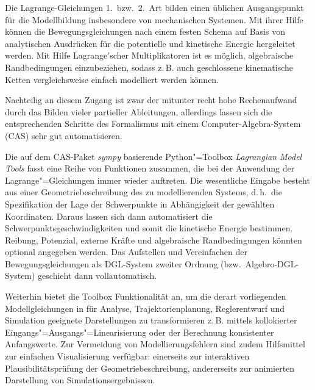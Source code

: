 \documentclass{gma}
\begin{document}
\erstautor{}

\maketitle
Die Lagrange-Gleichungen 1.\ bzw.\ 2.\ Art bilden einen üblichen Ausgangspunkt für die Modellbildung insbesondere von mechanischen Systemen. Mit ihrer Hilfe können die Bewegungsgleichungen nach einem festen Schema auf Basis von analytischen Ausdrücken für die potentielle und kinetische Energie hergeleitet werden. Mit Hilfe Lagrange'scher Multiplikatoren ist es möglich, algebraische Randbedingungen einzubeziehen, sodass z.\,B. auch geschlossene kinematische Ketten vergleichsweise einfach modelliert werden können.

Nachteilig an diesem Zugang ist zwar der mitunter recht hohe Rechenaufwand durch das Bilden vieler partieller Ableitungen, allerdings lassen sich die entsprechenden Schritte des Formalismus mit einem Computer-Algebra-System (CAS) sehr gut automatisieren.

Die auf dem CAS-Paket \textit{sympy} basierende Python"=Toolbox \textit{Lagrangian Model Tools} \cite{knoll2019symbtools} fasst eine Reihe von Funktionen zusammen, die bei der Anwendung der Lagrange"=Gleichungen immer wieder auftreten. Die wesentliche Eingabe besteht aus einer Geometriebeschreibung des zu modellierenden Systems, d.\,h.\ die Spezifikation der Lage der Schwerpunkte in Abhängigkeit der gewählten Koordinaten. Daraus lassen sich dann automatisiert die Schwerpunktsgeschwindigkeiten und somit die kinetische Energie bestimmen. Reibung, Potenzial, externe Kräfte und algebraische Randbedingungen könnten optional angegeben werden.
Das Aufstellen und Vereinfachen der Bewegungsgleichungen als DGL-System zweiter Ordnung (bzw.\ Algebro-DGL-System) geschieht dann vollautomatisch.

Weiterhin bietet die Toolbox Funktionalität an, um die derart vorliegenden Modellgleichungen in für Analyse, Trajektorienplanung, Reglerentwurf und Simulation geeignete Darstellungen zu transformieren z.\,B. mittels kollokierter Eingangs"=Ausgangs"=Linearisierung oder der Berechnung konsistenter Anfangswerte. Zur Vermeidung von Modellierungsfehlern sind zudem Hilfsmittel zur einfachen Visualisierung verfügbar: einerseits zur interaktiven Plausibilitätsprüfung der Geometriebeschreibung, andererseits zur animierten Darstellung von Simulationsergebnissen.
\end{document}
